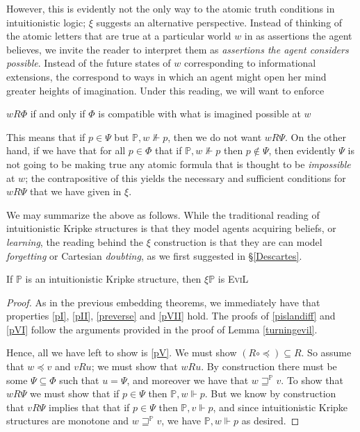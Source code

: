 However, this is evidently not the only way to the atomic truth
conditions in intuitionistic logic; $\xi$ suggests an alternative perspective.  Instead of thinking of the atomic
letters that are true at a 
particular world $w$ in as assertions the agent believes, 
we invite the reader to interpret them as 
\emph{assertions the agent considers possible}.  Instead of the future
states of $w$ corresponding to informational extensions, the
correspond to ways in which an agent might open her mind greater
heights of imagination.  Under this reading, we will want to enforce
\begin{center}
$w R \Phi$ if and only if $\Phi$ is compatible with what is imagined
possible at $w$
\end{center}
This means that if $p \in \Psi$ but $\mathbb{P}, w \nVdash p$, then we
do not want $w R \Psi$.  On the other hand, if we have that for all $p
\in \Phi$ that if $\mathbb{P},w\nVdash p$ then $p \nin \Psi$, then
evidently $\Psi$ is not going to be making true any atomic formula
that is thought to be \emph{impossible} at $w$; the contrapositive of
this yields the necessary and sufficient conditions for $w R \Psi$
that we have given in $\xi$.

We may summarize the above as follows.  While the traditional reading of
intuitionistic Kripke structures is that they model agents acquiring
beliefs, or \emph{learning}, the reading behind the $\xi$ construction
is that they are can model \emph{forgetting} or Cartesian
\emph{doubting}, as we first suggested in \S\ref{Descartes}. 

\begin{lemma}\label{turningevil4}
If $\mathbb{P}$ is an intuitionistic Kripke structure, then $\xi
\mathbb{P}$ is \textsc{EviL}
\end{lemma}
\begin{proof}
As in the previous embedding theorems, we immediately have that properties \ref{pI}, \ref{pII}, \ref{preverse} and
\ref{pVII} hold.  The proofs of \ref{pislandiff} and \ref{pVI} follow the
arguments provided in the proof of Lemma \ref{turningevil}.
    
Hence, all we have left to show is \ref{pV}.  We must show $(R \circ \preccurlyeq) \subseteq
      R$.  So assume that $w \preccurlyeq v$ and $v R u$; we must show
      that $w R u$.  By construction there must be some $\Psi\subseteq
      \Phi$ such that $u = \Psi$, and moreover we have that $w
      \sqsupseteq^{\mathbb{P}} v$.  To show that $w R \Psi$ we must show
      that if $p \in \Psi$ then $\mathbb{P},w \Vdash p$.  But we know
      by construction that $v R \Psi$ implies that
      that if $p \in \Psi$ then $\mathbb{P},v \Vdash p$, and since
      intuitionistic Kripke structures are monotone and $w
      \sqsupseteq^{\mathbb{P}} v$, we have $\mathbb{P},w \Vdash p$ 
      as desired.
\end{proof}

